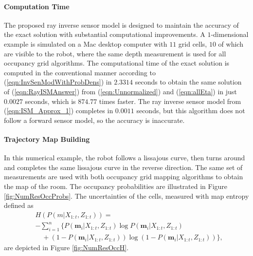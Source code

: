 \documentclass[letterpaper, 10pt, conference]{ieeeconf}
\newcommand{\refeqn}[1]{(\ref{eqn:#1})}
\begin{document}
\paragraph{Computation Time}
The proposed ray inverse sensor model is designed to maintain the accuracy of the exact solution with substantial computational improvements.
A $1$-dimensional example is simulated on a Mac desktop computer with $11$ grid cells, $10$ of which are visible to the robot, where the same depth measurement is used for all occupancy grid algorithms.
The computational time of the exact solution is computed in the conventional manner according to \refeqn{InvSenModWithProbDens} in $2.3314$ seconds to obtain the same solution of \refeqn{RayISMAnswer} from \refeqn{Unnormalized} and \refeqn{allEta} in just $0.0027$ seconds, which is $\mathbf{874.77}$ times faster.
The ray inverse sensor model from \refeqn{ISM_Approx_1} completes in $0.0011$ seconds, but this algorithm does not follow a forward sensor model, so the accuracy is inaccurate.








\paragraph{Trajectory Map Building}
In this numerical example, the robot follows a lissajous curve, then turns around and completes the same lissajous curve in the reverse direction.
The same set of measurements are used with both occupancy grid mapping algorithms to obtain the map of the room.
The occupancy probabilities are illustrated in Figure \ref{fig:NumResOccProbs}. The uncertainties of the cells, measured with map entropy defined as
\begin{align}
&H(P(m|X_{1:t},Z_{1:t}))=\nonumber\\&-\sum_{i=1}^n\bigg\{P(\mathbf{m}_i|X_{1:t},Z_{1:t})\log P(\mathbf{m}_i|X_{1:t},Z_{1:t})\nonumber\\&\quad+(1-P(\mathbf{m}_i|X_{1:t},Z_{1:t}))\log(1-P(\mathbf{m}_i|X_{1:t},Z_{1:t}))\bigg\},
\end{align}
are depicted in Figure \ref{fig:NumResOccH}.
\end{document}

